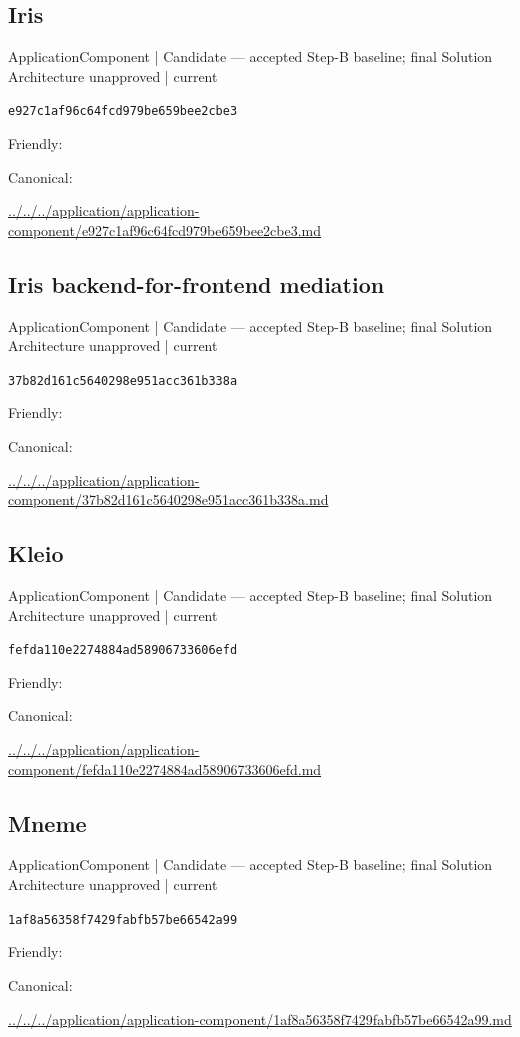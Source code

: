 \documentclass[10pt,a4paper]{article}
\begin{document}
\subsection*{Iris}
{\small ApplicationComponent | Candidate — accepted Step-B baseline; final Solution Architecture unapproved | current}\par
\texttt{e927c1af96c64fcd979be659bee2cbe3}\par
Friendly: \par
Canonical: \par
{\footnotesize\url{../../../application/application-component/e927c1af96c64fcd979be659bee2cbe3.md}}\par
\subsection*{Iris backend-for-frontend mediation}
{\small ApplicationComponent | Candidate — accepted Step-B baseline; final Solution Architecture unapproved | current}\par
\texttt{37b82d161c5640298e951acc361b338a}\par
Friendly: \par
Canonical: \par
{\footnotesize\url{../../../application/application-component/37b82d161c5640298e951acc361b338a.md}}\par
\subsection*{Kleio}
{\small ApplicationComponent | Candidate — accepted Step-B baseline; final Solution Architecture unapproved | current}\par
\texttt{fefda110e2274884ad58906733606efd}\par
Friendly: \par
Canonical: \par
{\footnotesize\url{../../../application/application-component/fefda110e2274884ad58906733606efd.md}}\par
\subsection*{Mneme}
{\small ApplicationComponent | Candidate — accepted Step-B baseline; final Solution Architecture unapproved | current}\par
\texttt{1af8a56358f7429fabfb57be66542a99}\par
Friendly: \par
Canonical: \par
{\footnotesize\url{../../../application/application-component/1af8a56358f7429fabfb57be66542a99.md}}\par
\end{document}
